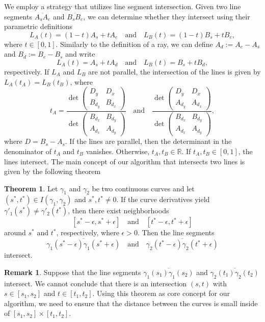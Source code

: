 \documentclass[a4paper, 11pt]{report}
\theoremstyle{definition}
\newtheorem{theorem}[definition]{Theorem}
\newtheorem*{remark}{Remark}
\begin{document}
	We employ a strategy that utilizes line segment intersection. Given two line segments $\overline{A_s A_e}$ and $\overline{B_s B_e}$, we can determine whether they intersect using their parametric definitions 
		$$L_A(t) = (1-t)A_s + tA_e \quad\text{and}\quad L_B(t) = (1-t)B_s + tB_e,$$
	where $t\in[0,1]$. Similarly to the definition of a ray, we can define $A_d := A_e - A_s$ and $B_d := B_e - B_s$ and write 
		$$L_A(t) = A_s + tA_d \quad\text{and}\quad L_B(t) = B_s + tB_d,$$ 
	respectively. If $L_A$ and $L_B$ are not parallel, the intersection of the lines is given by $L_A(t_A) = L_B(t_B)$, where
		$$ t_A = 
			\frac {
				\det
				\begin{pmatrix}
					D_y 	& D_x		\\
					B_{d_y}	& B_{d_x}
				\end{pmatrix}
			}
			{
				\det
				\begin{pmatrix}
					B_{d_x} & B_{d_y} 	\\
					A_{d_x} & A_{d_y}
				\end{pmatrix}
			}
			\quad\text{and}\quad
			\frac {
				\det
				\begin{pmatrix}
					D_y 	& D_x		\\
					A_{d_y}	& A_{d_x}
				\end{pmatrix}
			}
			{
				\det
				\begin{pmatrix}
					B_{d_x} & B_{d_y} 	\\
					A_{d_x} & A_{d_y}
				\end{pmatrix}
			},
		$$
	where $D = B_s - A_s$. If the lines are parallel, then the determinant in the denominator of $t_A$ and $t_B$ vanishes. Otherwise, $t_A, t_B \in \mathbb{R}$. If $t_A, t_B \in [0,1]$, the lines intersect. The main concept of our algorithm that intersects two lines is given by the following theorem

	\begin{theorem}
		Let $\gamma_1$ and $\gamma_2$ be two continuous curves and let $(s^*, t^*) \in I(\gamma_1, \gamma_2)$ and $s^*, t^* \neq 0$. If the curve derivatives yield $\gamma'_1(s^*) \neq \gamma'_2(t^*)$, then there exist neighborhoods 
			$$[s^*-\epsilon, s^*+\epsilon] \quad\text{and}\quad [t^*-\epsilon, t^*+\epsilon]$$
		around $s^*$ and $t^*$, respectively, where $\epsilon > 0$. Then the line segments
			$$\overline{\gamma_1(s^*-\epsilon) \gamma_1(s^*+\epsilon)} \quad\text{and}\quad \overline{\gamma_2(t^*-\epsilon) \gamma_2(t^*+\epsilon)}$$
		intersect.
	\end{theorem}
	\begin{remark}
 		Suppose that the line segments $\overline{\gamma_1(s_1) \gamma_1(s_2)}$ and $\overline{\gamma_2(t_1) \gamma_2(t_2)}$ intersect. We cannot conclude that there is an intersection $(s,t)$ with $s \in [s_1, s_2]$ and $t \in [t_1, t_2]$. Using this theorem as core concept for our algorithm, we need to ensure that the distance between the curves is small inside of $[s_1, s_2] \times [t_1, t_2]$.
	\end{remark}
\end{document}
